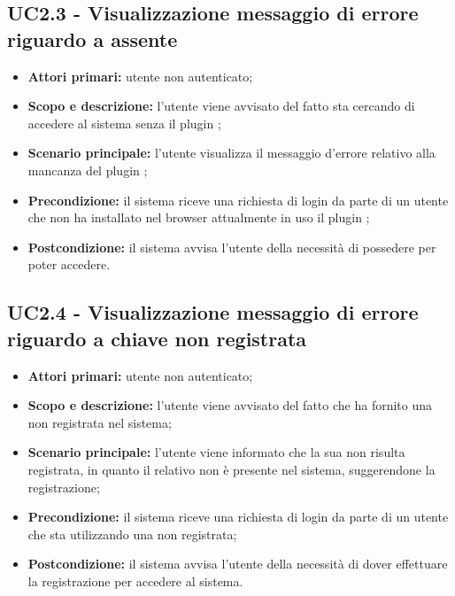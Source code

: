 \documentclass[AnalisiDeiRequisiti.tex]{subfiles}
\begin{document}
\subsection{UC2.3 - Visualizzazione messaggio di errore riguardo a  assente}
\begin{itemize}
	\item \textbf{Attori primari:} utente non autenticato;
	\item \textbf{Scopo e descrizione:} l'utente viene avvisato del fatto sta cercando di accedere al sistema senza il plugin ;
	\item \textbf{Scenario principale:} l'utente visualizza il messaggio d'errore relativo alla mancanza del plugin ;
	\item \textbf{Precondizione:} il sistema riceve una richiesta di login da parte di un utente che non ha installato nel browser attualmente in uso il plugin ;
	\item \textbf{Postcondizione:} il sistema avvisa l'utente della necessità di possedere  per poter accedere.
\end{itemize}
\subsection{UC2.4 - Visualizzazione messaggio di errore riguardo a chiave non registrata}
\begin{itemize}
	\item \textbf{Attori primari:} utente non autenticato;
	\item \textbf{Scopo e descrizione:} l'utente viene avvisato del fatto che ha fornito una  non registrata nel sistema;
	\item \textbf{Scenario principale:} l'utente viene informato che la sua  non risulta registrata, in quanto il relativo  non è presente nel sistema, suggerendone la registrazione;
	\item \textbf{Precondizione:} il sistema riceve una richiesta di login da parte di un utente che sta utilizzando una  non registrata;
	\item \textbf{Postcondizione:} il sistema avvisa l'utente della necessità di dover effettuare la registrazione per accedere al sistema.
\end{itemize}
\end{document}
